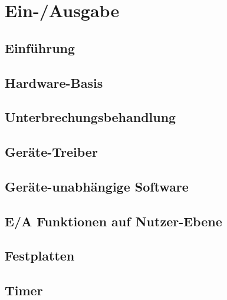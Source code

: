 \section{Ein-/Ausgabe}

\subsection{Einführung}

\subsection{Hardware-Basis}

\subsection{Unterbrechungsbehandlung}

\subsection{Geräte-Treiber}

\subsection{Geräte-unabhängige Software}

\subsection{E/A Funktionen auf Nutzer-Ebene}

\subsection{Festplatten}

\subsection{Timer}
